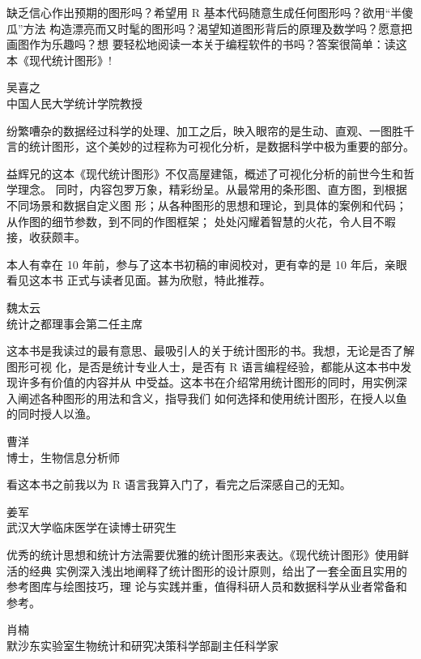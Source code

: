 \documentclass[
  b5paper,
  UTF8,twoside]{book}
\begin{document}
缺乏信心作出预期的图形吗？希望用 R 基本代码随意生成任何图形吗？欲用``半傻瓜''方法 构造漂亮而又时髦的图形吗？渴望知道图形背后的原理及数学吗？愿意把画图作为乐趣吗？想 要轻松地阅读一本关于编程软件的书吗？答案很简单：读这本《现代统计图形》!

\begin{flushright}
吴喜之\\
中国人民大学统计学院教授
\end{flushright}

纷繁嘈杂的数据经过科学的处理、加工之后，映入眼帘的是生动、直观、一图胜千言的统计图形，这个美妙的过程称为可视化分析，是数据科学中极为重要的部分。

益辉兄的这本《现代统计图形》不仅高屋建瓴，概述了可视化分析的前世今生和哲学理念。 同时，内容包罗万象，精彩纷呈。从最常用的条形图、直方图，到根据不同场景和数据自定义图 形；从各种图形的思想和理论，到具体的案例和代码；从作图的细节参数，到不同的作图框架； 处处闪耀着智慧的火花，令人目不暇接，收获颇丰。

本人有幸在 10 年前，参与了这本书初稿的审阅校对，更有幸的是 10 年后，亲眼看见这本书 正式与读者见面。甚为欣慰，特此推荐。

\begin{flushright}
魏太云\\
统计之都理事会第二任主席
\end{flushright}

这本书是我读过的最有意思、最吸引人的关于统计图形的书。我想，无论是否了解图形可视 化，是否是统计专业人士，是否有 R 语言编程经验，都能从这本书中发现许多有价值的内容并从 中受益。这本书在介绍常用统计图形的同时，用实例深入阐述各种图形的用法和含义，指导我们 如何选择和使用统计图形，在授人以鱼的同时授人以渔。

\begin{flushright}
曹洋\\
博士，生物信息分析师
\end{flushright}

看这本书之前我以为 R 语言我算入门了，看完之后深感自己的无知。

\begin{flushright}
姜军\\
武汉大学临床医学在读博士研究生
\end{flushright}

优秀的统计思想和统计方法需要优雅的统计图形来表达。《现代统计图形》使用鲜活的经典 实例深入浅出地阐释了统计图形的设计原则，给出了一套全面且实用的参考图库与绘图技巧，理 论与实践并重，值得科研人员和数据科学从业者常备和参考。

\begin{flushright}
肖楠\\
默沙东实验室生物统计和研究决策科学部副主任科学家
\end{flushright}
\end{document}
